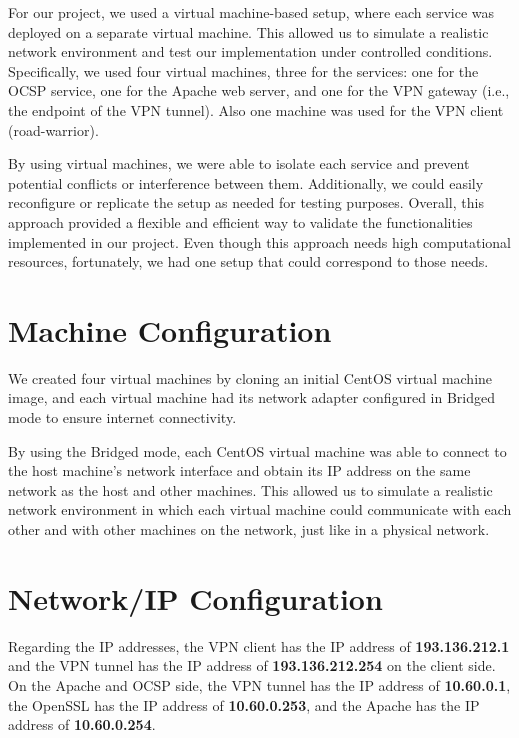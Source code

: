 \documentclass[12pt]{article}
\begin{document}
\newpage

For our project, we used a virtual machine-based setup, where each service was deployed on a separate virtual machine. This allowed us to simulate a realistic network environment and test our implementation under controlled conditions. Specifically, we used four virtual machines, three for the services: one for the OCSP service, one for the Apache web server, and one for the VPN gateway (i.e., the endpoint of the VPN tunnel). Also one machine was used for the VPN client (road-warrior).

By using virtual machines, we were able to isolate each service and prevent potential conflicts or interference between them. Additionally, we could easily reconfigure or replicate the setup as needed for testing purposes. Overall, this approach provided a flexible and efficient way to validate the functionalities implemented in our project. Even though this approach needs high computational resources, fortunately, we had one setup that could correspond to those needs.

\section{Machine Configuration}

 We created four virtual machines by cloning an initial CentOS virtual machine image, and each virtual machine had its network adapter configured in Bridged mode to ensure internet connectivity.

By using the Bridged mode, each CentOS virtual machine was able to connect to the host machine's network interface and obtain its IP address on the same network as the host and other machines. This allowed us to simulate a realistic network environment in which each virtual machine could communicate with each other and with other machines on the network, just like in a physical network.

\section{Network/IP Configuration}

Regarding the IP addresses, the VPN client has the IP address of \textbf{193.136.212.1} and the VPN tunnel has the IP address of \textbf{193.136.212.254} on the client side. On the Apache and OCSP side, the VPN tunnel has the IP address of \textbf{10.60.0.1}, the OpenSSL has the IP address of \textbf{10.60.0.253}, and the Apache has the IP address of \textbf{10.60.0.254}.
\end{document}
